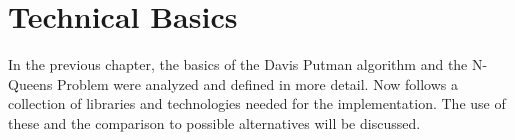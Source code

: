 

\chapter{Technical Basics}
\label{ch:tecBasics}
In the previous chapter, the basics of the Davis Putman algorithm and the N-Queens Problem were analyzed and defined in more detail. Now follows a collection of libraries and technologies needed for the implementation. The use of these and the comparison to possible alternatives will be discussed. 


